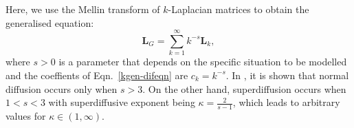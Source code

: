 \documentclass[10pt,a4paper]{article}
\begin{document}
\begin{enumerate}[1)]
\begin{enumerate}[i)]
    	    	Here, we use the Mellin transform of $k$-Laplacian matrices to obtain the generalised equation:
    	    	\begin{equation}
    	    	\mathbf{L}_{G} = \sum_{k=1}^{\infty} k^{-s} \mathbf{L}_k,
    	    	\label{mellin-transforms}
    	    	\end{equation}
    	    	where $s >0$ is a parameter that depends on the specific situation to be modelled and the coeffients of Eqn.~\ref{kgen-difeqn} are $c_{k} = k^{-s}$. 	
    	    	In \citep{estrada2017path}, it is shown that normal diffusion occurs only when $s > 3$. On the other hand, superdiffusion occurs when $1 <s < 3$ with superdiffusive exponent being $ \kappa = \frac{2}{s-1}$,
    	    	which leads to arbitrary values for $\kappa \in (1,\infty)$. 
    	    \end{enumerate}
        \end{enumerate}
        
        
        
        
        
\end{document}
